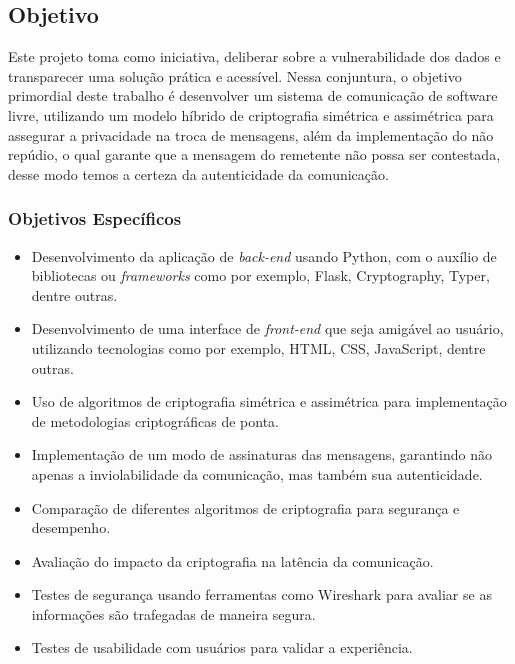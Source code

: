 
\subsection{Objetivo}

Este projeto toma como iniciativa, deliberar sobre a vulnerabilidade
dos dados e transparecer uma solução prática e acessível. Nessa
conjuntura, o objetivo primordial deste trabalho é desenvolver um
sistema de comunicação de software livre, utilizando um modelo
híbrido de criptografia simétrica e assimétrica para assegurar a
privacidade na troca de mensagens, além da implementação do não
repúdio, o qual garante que a mensagem do remetente não possa ser
contestada, desse modo temos a certeza da autenticidade da comunicação.

\subsubsection{Objetivos Específicos}

\begin{itemize}
  \item Desenvolvimento da aplicação de \textit{\gls{back-end}}
    usando Python, com
    o auxílio de bibliotecas ou \textit{frameworks} como por exemplo, Flask,
    Cryptography, Typer, dentre outras.
  \item Desenvolvimento de uma interface de \textit{\gls{front-end}} que seja
    amigável ao usuário, utilizando tecnologias como por exemplo,
    \acs{HTML}, \acs{CSS}, JavaScript, dentre outras.
  \item Uso de algoritmos de criptografia simétrica e assimétrica
    para implementação de metodologias criptográficas de ponta.
  \item Implementação de um modo de assinaturas das mensagens,
    garantindo não apenas a inviolabilidade da comunicação, mas
    também sua autenticidade.
  \item Comparação de diferentes algoritmos de criptografia para
    segurança e desempenho.
  \item Avaliação do impacto da criptografia na latência da comunicação.
  \item Testes de segurança usando ferramentas como Wireshark para
    avaliar se as informações são trafegadas de maneira segura.
  \item Testes de usabilidade com usuários para validar a experiência.
\end{itemize}

